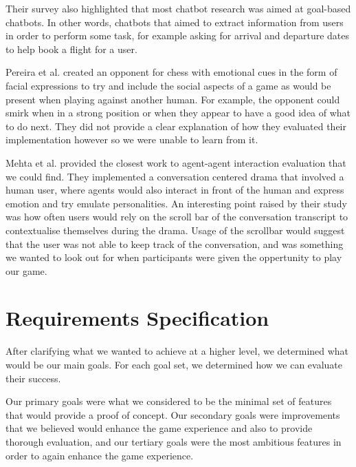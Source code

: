 \documentclass{article}
\begin{document}
Their survey also highlighted that most chatbot research was aimed at goal-based chatbots. In other words, chatbots that aimed to extract information from users in order to perform some task, for example asking for arrival and departure dates to help book a flight for a user. 

Pereira et al. \cite{pervchess} created an opponent for chess with emotional cues in the form of facial expressions to try and include the social aspects of a game as would be present when playing against another human. For example, the opponent could smirk when in a strong position or when they appear to have a good idea of what to do next. They did not provide a clear explanation of how they evaluated their implementation however so we were unable to learn from it. 

Mehta et al. \cite{convdrama} provided the closest work to agent-agent interaction evaluation that we could find. They implemented a conversation centered drama that involved a human user, where agents would also interact in front of the human and express emotion and try emulate personalities. An interesting point raised by their study was how often users would rely on the scroll bar of the conversation transcript to contextualise themselves during the drama. Usage of the scrollbar would suggest that the user was not able to keep track of the conversation, and was something we wanted to look out for when participants were given the oppertunity to play our game.

\clearpage
\section{Requirements Specification} \label{sec:reqspec}

After clarifying what we wanted to achieve at a higher level, we determined what would be our main goals. For each goal set, we determined how we can evaluate their success. 

Our primary goals were what we considered to be the minimal set of features that would provide a proof of concept. Our secondary goals were improvements that we believed would enhance the game experience and also to provide thorough evaluation, and our tertiary goals were the most ambitious features in order to again enhance the game experience.
\end{document}

